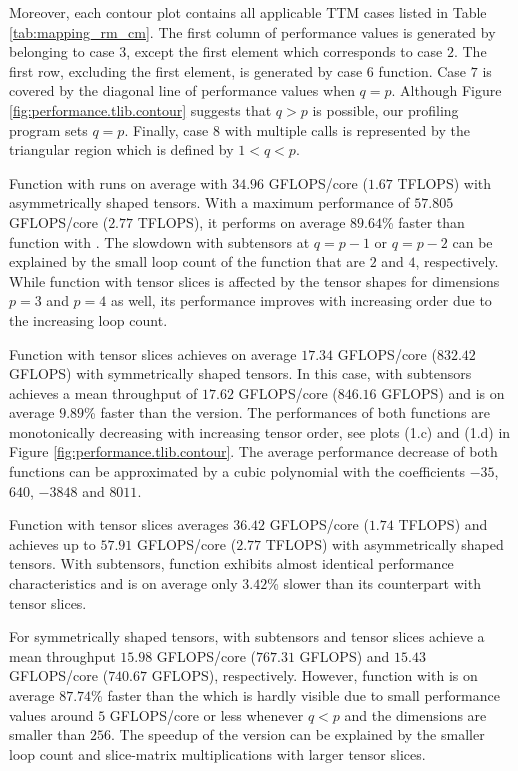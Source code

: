 Moreover, each contour plot contains all applicable TTM cases listed in Table \ref{tab:mapping_rm_cm}.
The first column of performance values is generated by  belonging to case $3$, except the first element which corresponds to case $2$.
The first row, excluding the first element, is generated by case $6$ function.
Case $7$ is covered by the diagonal line of performance values when $q = p$.  
Although Figure \ref{fig:performance.tlib.contour} suggests that $q>p$ is possible, our profiling program sets $q=p$.
Finally, case $8$ with multiple  calls is represented by the triangular region which is defined by $1<q<p$.


Function  with  runs on average with $34.96$ GFLOPS/core ($1.67$ TFLOPS) with asymmetrically shaped tensors.
With a maximum performance of $57.805$ GFLOPS/core ($2.77$ TFLOPS), it performs on average $89.64$\% faster than function  with .
The slowdown with subtensors at $q=p-1$ or $q=p-2$ can be explained by the small loop count of the function that are $2$ and $4$, respectively.
While function  with tensor slices is affected by the tensor shapes for dimensions $p=3$ and $p=4$ as well, its performance improves with increasing order due to the increasing loop count.

Function  with tensor slices achieves on average $17.34$ GFLOPS/core ($832.42$ GFLOPS) with symmetrically shaped tensors.
In this case,  with subtensors achieves a mean throughput of $17.62$ GFLOPS/core ($846.16$ GFLOPS) and is on average $9.89$\% faster than the  version.
The performances of both functions are monotonically decreasing with increasing tensor order, see plots (1.c) and (1.d) in Figure \ref{fig:performance.tlib.contour}.
The average performance decrease of both functions can be approximated by a cubic polynomial with the coefficients $-35$, $640$, $-3848$ and $8011$.

Function  with tensor slices averages $36.42$ GFLOPS/core ($1.74$ TFLOPS) and achieves up to $57.91$ GFLOPS/core ($2.77$ TFLOPS) with asymmetrically shaped tensors.
With subtensors, function  exhibits almost identical performance characteristics and is on average only $3.42$\% slower than its counterpart with tensor slices.

For symmetrically shaped tensors,  with subtensors and tensor slices achieve a mean throughput $15.98$ GFLOPS/core ($767.31$ GFLOPS) and $15.43$ GFLOPS/core ($740.67$ GFLOPS), respectively.
However, function  with  is on average $87.74$\% faster than the  which is hardly visible due to small performance values around $5$ GFLOPS/core or less whenever $q<p$ and the dimensions are smaller than $256$.
The speedup of the  version can be explained by the smaller loop count and slice-matrix multiplications with larger tensor slices.

